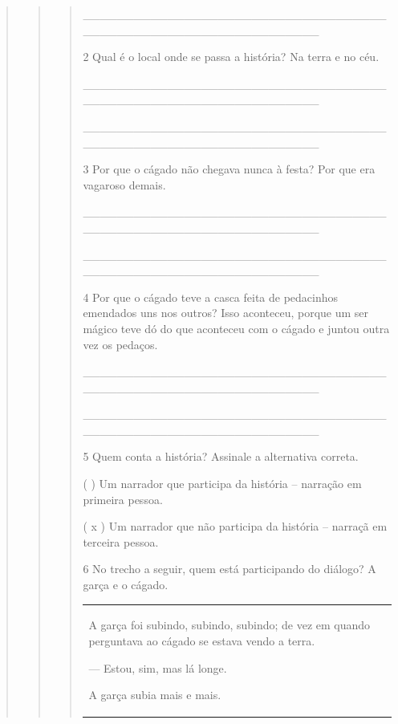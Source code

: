 \begin{boxlist}
{{\begin{quote}
\begin{quote}
\begin{quote}
{\_\_\_\_\_\_\_\_\_\_\_\_\_\_\_\_\_\_\_\_\_\_\_\_\_\_\_\_\_\_\_\_\_\_\_\_\_\_\_\_\_\_\_\_\_\_\_\_\_\_\_\_\_\_\_\_\_\_\_\_\_\_\_\_

\num{2} Qual é o local onde se passa a história? Na terra e no céu.

\_\_\_\_\_\_\_\_\_\_\_\_\_\_\_\_\_\_\_\_\_\_\_\_\_\_\_\_\_\_\_\_\_\_\_\_\_\_\_\_\_\_\_\_\_\_\_\_\_\_\_\_\_\_\_\_\_\_\_\_\_\_\_\_

\_\_\_\_\_\_\_\_\_\_\_\_\_\_\_\_\_\_\_\_\_\_\_\_\_\_\_\_\_\_\_\_\_\_\_\_\_\_\_\_\_\_\_\_\_\_\_\_\_\_\_\_\_\_\_\_\_\_\_\_\_\_\_\_

\num{3} Por que o cágado não chegava nunca à festa? Por que era vagaroso
demais.

\protect\hypertarget{_Hlk127856302}{}{}\_\_\_\_\_\_\_\_\_\_\_\_\_\_\_\_\_\_\_\_\_\_\_\_\_\_\_\_\_\_\_\_\_\_\_\_\_\_\_\_\_\_\_\_\_\_\_\_\_\_\_\_\_\_\_\_\_\_\_\_\_\_\_\_

\_\_\_\_\_\_\_\_\_\_\_\_\_\_\_\_\_\_\_\_\_\_\_\_\_\_\_\_\_\_\_\_\_\_\_\_\_\_\_\_\_\_\_\_\_\_\_\_\_\_\_\_\_\_\_\_\_\_\_\_\_\_\_\_

\num{4} Por que o cágado teve a casca feita de pedacinhos emendados uns nos
outros? Isso aconteceu, porque um ser mágico teve dó do que aconteceu com o cágado e juntou outra
vez os pedaços.

\_\_\_\_\_\_\_\_\_\_\_\_\_\_\_\_\_\_\_\_\_\_\_\_\_\_\_\_\_\_\_\_\_\_\_\_\_\_\_\_\_\_\_\_\_\_\_\_\_\_\_\_\_\_\_\_\_\_\_\_\_\_\_\_

\_\_\_\_\_\_\_\_\_\_\_\_\_\_\_\_\_\_\_\_\_\_\_\_\_\_\_\_\_\_\_\_\_\_\_\_\_\_\_\_\_\_\_\_\_\_\_\_\_\_\_\_\_\_\_\_\_\_\_\_\_\_\_\_

\num{5} Quem conta a história? Assinale a alternativa correta.

( ) Um narrador que participa da história -- narração em primeira pessoa.

( x ) Um narrador que não participa da história -- narraçã em terceira pessoa.

\num{6} No trecho a seguir, quem está participando do diálogo? A garça e o
cágado.

\begin{longtable}[]{@{}l@{}}
\toprule
\begin{minipage}[t]{0.97\columnwidth}\raggedright\strut
A garça foi subindo, subindo, subindo; de vez em quando perguntava ao
cágado se estava vendo a terra.

--- Estou, sim, mas lá longe.

A garça subia mais e mais.


\end{minipage}
\end{longtable}}
\end{quote}
\end{quote}
\end{quote}}}
\end{boxlist}

